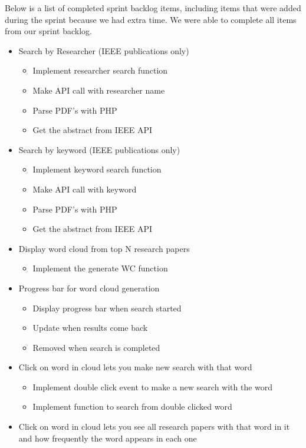 \documentclass[]{article}
\begin{document}
Below is a list of completed sprint backlog items, including items that
were added during the sprint because we had extra time. We were able to
complete all items from our sprint backlog.

\begin{itemize}
\itemsep1pt\parskip0pt
\item
  Search by Researcher (IEEE publications only)

  \begin{itemize}
  \itemsep1pt\parskip0pt
  \item
    Implement researcher search function
  \item
    Make API call with researcher name
  \item
    Parse PDF's with PHP
  \item
    Get the abstract from IEEE API
  \end{itemize}
\item
  Search by keyword (IEEE publications only)

  \begin{itemize}
  \itemsep1pt\parskip0pt
  \item
    Implement keyword search function
  \item
    Make API call with keyword
  \item
    Parse PDF's with PHP
  \item
    Get the abstract from IEEE API
  \end{itemize}
\item
  Display word cloud from top N research papers

  \begin{itemize}
  \itemsep1pt\parskip0pt
  \item
    Implement the generate WC function
  \end{itemize}
\item
  Progress bar for word cloud generation

  \begin{itemize}
  \itemsep1pt\parskip0pt
  \item
    Display progress bar when search started
  \item
    Update when results come back
  \item
    Removed when search is completed
  \end{itemize}
\item
  Click on word in cloud lets you make new search with that word

  \begin{itemize}
  \itemsep1pt\parskip0pt
  \item
    Implement double click event to make a new search with the word
  \item
    Implement function to search from double clicked word
  \end{itemize}
\item
  Click on word in cloud lets you see all research papers with that word
  in it and how frequently the word appears in each one


\end{itemize}
\end{document}
